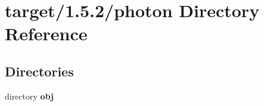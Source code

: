 \section{target/1.5.2/photon Directory Reference}
\label{dir_1738661643e07eeb436fe9e7a71a11f9}
\subsection*{Directories}
\begin{DoxyCompactItemize}
\item 
directory \textbf{ obj}
\end{DoxyCompactItemize}
